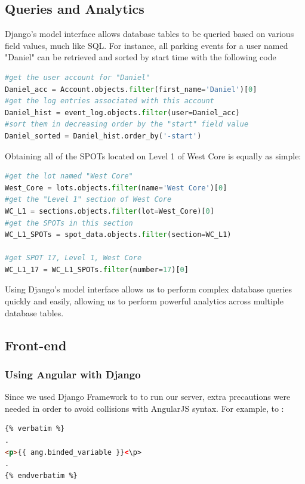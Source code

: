 \subsection{Queries and Analytics}
Django's model interface allows database tables to be queried based on various field values, much like SQL.
For instance, all parking events for a user named "Daniel" can be retrieved and sorted by start time with the following code
\begin{lstlisting}[language=Python]
#get the user account for "Daniel"
Daniel_acc = Account.objects.filter(first_name='Daniel')[0]
#get the log entries associated with this account
Daniel_hist = event_log.objects.filter(user=Daniel_acc)
#sort them in decreasing order by the "start" field value
Daniel_sorted = Daniel_hist.order_by('-start')
\end{lstlisting}
Obtaining all of the SPOTs located on Level 1 of West Core is equally as simple:
\begin{lstlisting}[language=Python]
#get the lot named "West Core"
West_Core = lots.objects.filter(name='West Core')[0]
#get the "Level 1" section of West Core
WC_L1 = sections.objects.filter(lot=West_Core)[0]
#get the SPOTs in this section
WC_L1_SPOTs = spot_data.objects.filter(section=WC_L1)

#get SPOT 17, Level 1, West Core
WC_L1_17 = WC_L1_SPOTs.filter(number=17)[0]
\end{lstlisting}

Using Django's model interface allows us to perform complex database queries quickly and easily, allowing us to perform powerful analytics across multiple database tables.

\newpage
\subsection{Front-end}
\subsubsection{Using Angular with Django}
Since we used Django Framework to to run our server, extra precautions were needed in order to avoid collisions with AngularJS syntax.
For example, to :
\vspace{0.5cm}
\begin{lstlisting}[language=html]
{% verbatim %}
.
<p>{{ ang.binded_variable }}<\p>
.
{% endverbatim %}
\end{lstlisting}
\vspace{0.5cm}

